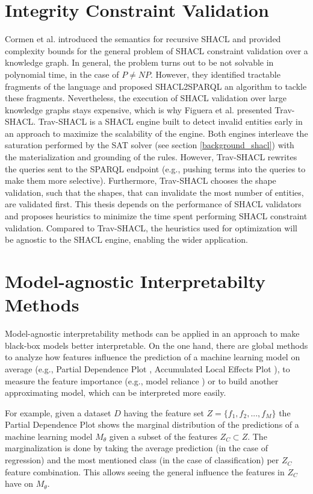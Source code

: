 \section{Integrity Constraint Validation}
Cormen et al. \cite{corman2018semantics} introduced the semantics for recursive SHACL and provided complexity bounds for the general problem of SHACL constraint validation over a knowledge graph. In general, the problem turns out to be not solvable in polynomial time, in the case of $P \neq NP$. However, they identified tractable fragments of the language \cite{corman2019validating} and proposed SHACL2SPARQL \cite{corman2019shacl2sparql} an algorithm to tackle these fragments. Nevertheless, the execution of SHACL validation over large knowledge graphs stays expensive, which is why Figuera et al. \cite{figuera2021trav} presented Trav-SHACL. Trav-SHACL is a SHACL engine built to detect invalid entities early in an approach to maximize the scalability of the engine. Both engines interleave the saturation performed by the SAT solver (see section \ref{background_shacl}) with the materialization and grounding of the rules. However, Trav-SHACL rewrites 
the queries sent to the SPARQL endpoint (e.g., pushing  terms into the queries to make them more selective). Furthermore, Trav-SHACL chooses the shape validation, such that the shapes, that can invalidate the most number of entities, are validated first. This thesis depends on the performance of SHACL validators and proposes heuristics to minimize the time spent performing SHACL constraint validation. Compared to Trav-SHACL, the heuristics used for optimization will be agnostic to the SHACL engine, enabling the wider application.


\section{Model-agnostic Interpretabilty Methods}
Model-agnostic interpretability methods can be applied in an approach to make black-box models better interpretable. On the one hand, there are global methods to analyze how features influence the prediction of a machine learning model on average (e.g., Partial Dependence Plot \cite{friedman2001greedy}, Accumulated Local Effects Plot \cite{apley2020visualizing}), to measure the feature importance (e.g., model reliance \cite{fisher2019all}) or to build another approximating model, which can be interpreted more easily. 

For example, given a dataset $D$ having the feature set $Z = \{f_1,f_2,...,f_M\}$ the Partial Dependence Plot shows the marginal distribution of the predictions of a machine learning model $M_\theta$ given a subset of the features $Z_C \subset Z$. The marginalization is done by taking the average prediction (in the case of regression) and the most mentioned class (in the case of classification) per $Z_C$ feature combination. This allows seeing the general influence the features in $Z_C$ have on $M_\theta$. 

